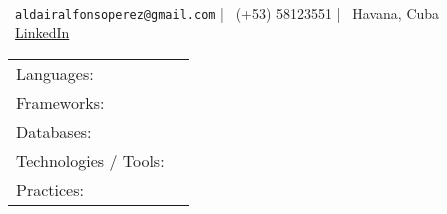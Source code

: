 \documentclass[]{awesome-cv}
\begin{document}

\begin{center}
  \\
  \vspace{2mm}
  {\faEnvelope\ \texttt{aldairalfonsoperez@gmail.com} |
   \faMobile\ (+53) 58123551 |
   \faMapMarker\ Havana, Cuba}\\
  \faLink\ \href{https://www.linkedin.com/in/aldair-alfonso-722b5421a/}{LinkedIn}
\end{center}


\begin{cventries}
	\cventry
	{}
	{\def\arraystretch{1.15}{\begin{tabular}{ l l }
				Languages:                            & {\skill{ C\#, Python, C, C++, SQL, JavaScript.}}                       \\
				Frameworks:                           & {\skill{ .Net, ASP.NET, Django, FastAPI.}}                                        \\
				Databases:                            & {\skill{ MySQL, PostgreSQL, SQLite.}}                                             \\
				Technologies / Tools: \hspace{0.05cm} & {\skill{ Visual Studio, Unity Editor, Git, Docker, npm.}}                         \\
				Practices:                            & {\skill{ Agile, Scrum, SOLID Principles, Test-Driven Development, Code Reviews.}} \\
			\end{tabular}}}
	{}
	{}
	{}
\end{cventries}
\vspace{-7mm}
\end{document}
